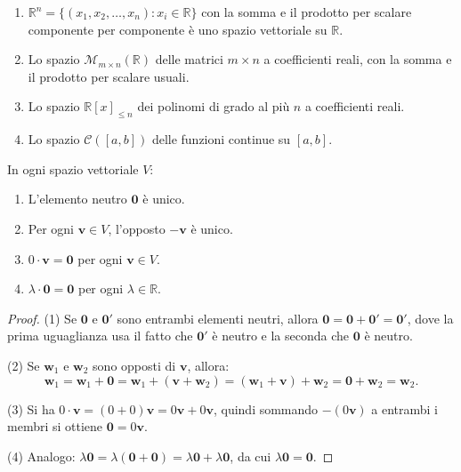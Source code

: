 \begin{examplebox}
\begin{enumerate}
    \item $\mathbb{R}^n = \{(x_1, x_2, \ldots, x_n) : x_i \in \mathbb{R}\}$ con la somma e il prodotto per scalare componente per componente è uno spazio vettoriale su $\mathbb{R}$.
    \item Lo spazio $\mathcal{M}_{m \times n}(\mathbb{R})$ delle matrici $m \times n$ a coefficienti reali, con la somma e il prodotto per scalare usuali.
    \item Lo spazio $\mathbb{R}[x]_{\leq n}$ dei polinomi di grado al più $n$ a coefficienti reali.
    \item Lo spazio $\mathcal{C}([a,b])$ delle funzioni continue su $[a,b]$.
\end{enumerate}
\end{examplebox}

\begin{theorembox}
In ogni spazio vettoriale $V$:
\begin{enumerate}
    \item L'elemento neutro $\mathbf{0}$ è unico.
    \item Per ogni $\mathbf{v} \in V$, l'opposto $-\mathbf{v}$ è unico.
    \item $0 \cdot \mathbf{v} = \mathbf{0}$ per ogni $\mathbf{v} \in V$.
    \item $\lambda \cdot \mathbf{0} = \mathbf{0}$ per ogni $\lambda \in \mathbb{R}$.
\end{enumerate}
\end{theorembox}
\begin{proof}
(1) Se $\mathbf{0}$ e $\mathbf{0}'$ sono entrambi elementi neutri, allora $\mathbf{0} = \mathbf{0} + \mathbf{0}' = \mathbf{0}'$, dove la prima uguaglianza usa il fatto che $\mathbf{0}'$ è neutro e la seconda che $\mathbf{0}$ è neutro.

(2) Se $\mathbf{w}_1$ e $\mathbf{w}_2$ sono opposti di $\mathbf{v}$, allora:
\[ \mathbf{w}_1 = \mathbf{w}_1 + \mathbf{0} = \mathbf{w}_1 + (\mathbf{v} + \mathbf{w}_2) = (\mathbf{w}_1 + \mathbf{v}) + \mathbf{w}_2 = \mathbf{0} + \mathbf{w}_2 = \mathbf{w}_2. \]

(3) Si ha $0 \cdot \mathbf{v} = (0+0)\mathbf{v} = 0\mathbf{v} + 0\mathbf{v}$, quindi sommando $-(0\mathbf{v})$ a entrambi i membri si ottiene $\mathbf{0} = 0\mathbf{v}$.

(4) Analogo: $\lambda \mathbf{0} = \lambda(\mathbf{0} + \mathbf{0}) = \lambda\mathbf{0} + \lambda\mathbf{0}$, da cui $\lambda\mathbf{0} = \mathbf{0}$.
\end{proof}

